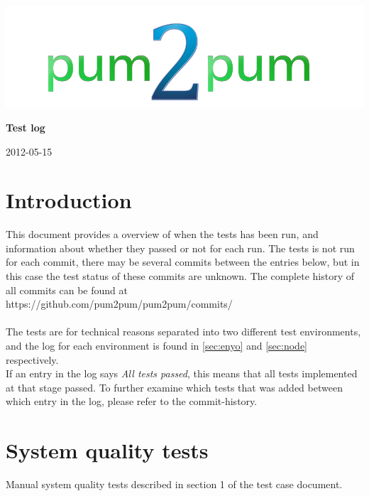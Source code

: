 \documentclass[a4paper, 12pt, titlepage]{article}
\begin{document}
	
	\begin{titlepage}
		
		\includegraphics[scale=0.4]{logoNormal.png}
		
		\vspace{6cm}
		
		\begin{center}
			\Huge{\textbf{Test log}} %
			
			\vspace{0.5cm}
			
			\huge{2012-05-15} %
		\end{center}
		
	\end{titlepage}
	
	\newpage


	\section{Introduction}
	This document provides a overview of when the tests has been run, and  information about whether they passed or not for each run. The tests is not run for each commit, there may be several commits between the entries below, but in this case the test status of these commits are unknown. The complete history of all commits can be found at\\

	https://github.com/pum2pum/pum2pum/commits/\\\\
	The tests are for technical reasons separated into two different test environments, and the log for each environment is found in \autoref{sec:enyo} and \autoref{sec:node} respectively.\\

	If an entry in the log says \emph{All tests passed}, this means that all tests implemented at that stage passed. To further examine which tests that was added between which entry in the log, please refer to the commit-history.


	\section{System quality tests}
	\label{sec:quality}
	Manual system quality tests described in section 1 of the test case document.\\
\end{document}
